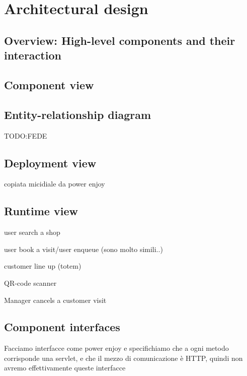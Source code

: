 \section{Architectural design}
\label{sect:overalldescription}

\subsection{Overview: High-level components and their interaction}
\label{subsect:Overview:Highlevelcomponentsandtheirinteraction}

\subsection{Component view}
\label{subsect:componentview}

\subsection{Entity-relationship diagram}
\label{subsect:entityrelationshipdiagram}

TODO:FEDE

\subsection{Deployment view}
\label{subsect:deploymentview}

copiata micidiale da power enjoy

\subsection{Runtime view}
\label{subsect:runtimeview}

user search a shop

user book a visit/user enqueue (sono molto simili..)

customer line up (totem)

QR-code scanner

Manager cancels a customer visit

\subsection{Component interfaces}
\label{subsect:componentinterfaces}

Facciamo interfacce come power enjoy e specifichiamo che a ogni metodo corrisponde una servlet, e che il mezzo di comunicazione è HTTP, quindi non avremo effettivamente queste interfacce

